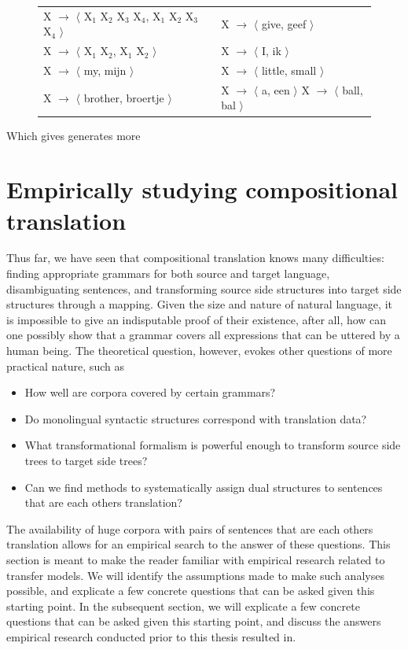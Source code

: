 \documentclass{report}
\theoremstyle{definition}
\theoremstyle{plain}
\begin{document}
\begin{figure}[!ht]
\begin{tabular}{lll}
X $\rightarrow$ $\langle$ X$_1$ X$_2$ X$_3$ X$_4$, X$_1$ X$_2$ X$_3$ X$_4$  $\rangle$ && X $\rightarrow$ $\langle$ give, geef $\rangle$\\
X $\rightarrow$ $\langle$ X$_1$ X$_2$, X$_1$ X$_2$ $\rangle$ && X $\rightarrow$ $\langle$ I, ik $\rangle$ \\
X $\rightarrow$ $\langle$ my, mijn $\rangle$ && X $\rightarrow$ $\langle$  little, small $\rangle$ \\
X $\rightarrow$ $\langle$ brother, broertje $\rangle$ && X $\rightarrow$ $\langle$ a, een $\rangle$
X $\rightarrow$ $\langle$ ball, bal $\rangle$\\
\end{tabular}
\end{figure}

Which gives generates more 

\section{Empirically studying compositional translation}

Thus far, we have seen that compositional translation knows many difficulties: finding appropriate grammars for both source and target language, disambiguating sentences, and transforming source side structures into target side structures through a mapping. Given the size and nature of natural language, it is impossible to give an indisputable proof of their existence, after all, how can one possibly show that a grammar covers all expressions that can be uttered by a human being. The theoretical question, however, evokes other questions of more practical nature, such as

\begin{itemize}
\item How well are corpora covered by certain grammars?
\item Do monolingual syntactic structures correspond with translation data?
\item What transformational formalism is powerful enough to transform source side trees to target side trees?
\item Can we find methods to systematically assign dual structures to sentences that are each others translation?
\end{itemize}

The availability of huge corpora with pairs of sentences that are each others translation allows for an empirical search to the answer of these questions. This section is meant to make the reader familiar with empirical research related to transfer models. We will identify the assumptions made to make such analyses possible, and explicate a few concrete questions that can be asked given this starting point. In the subsequent section, we will explicate a few concrete questions that can be asked given this starting point, and discuss the answers empirical research conducted prior to this thesis resulted in.
\end{document}
